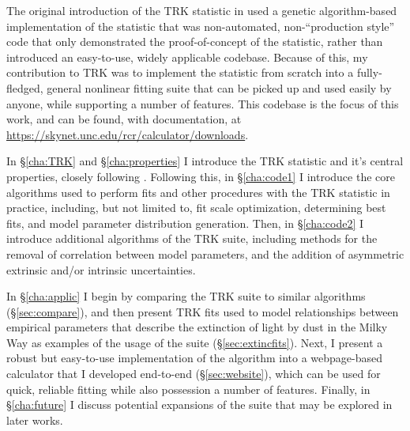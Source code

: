The original introduction of the TRK statistic in \textcite{trotter} used a genetic algorithm-based implementation of the statistic that was non-automated, non-``production style'' code that only demonstrated the proof-of-concept of the statistic, rather than introduced an easy-to-use, widely applicable codebase. Because of this, my contribution to TRK was to implement the statistic from scratch into a fully-fledged, general nonlinear fitting suite that can be picked up and used easily by anyone, while supporting a number of features. This codebase is the focus of this work, and can be found, with documentation, at \url{https://skynet.unc.edu/rcr/calculator/downloads}.

In \S\ref{cha:TRK} and \S\ref{cha:properties} I introduce the TRK statistic and it's central properties, closely following \textcite{trotter}. Following this, in \S\ref{cha:code1} I introduce the core algorithms used to perform fits and other procedures with the TRK statistic in practice, including, but not limited to, fit scale optimization, determining best fits, and model parameter distribution generation. Then, in \S\ref{cha:code2} I introduce additional algorithms of the TRK suite, including methods for the removal of correlation between model parameters, and the addition of asymmetric extrinsic and/or intrinsic uncertainties.

In \S\ref{cha:applic} I begin by comparing the TRK suite to similar algorithms (\S\ref{sec:compare}), and then present TRK fits used to model relationships between empirical parameters that describe the extinction of light by dust in the Milky Way as examples of the usage of the suite (\S\ref{sec:extincfits}). Next, I present a robust but easy-to-use implementation of the algorithm into a webpage-based calculator that I developed end-to-end (\S\ref{sec:website}), which can be used for quick, reliable fitting while also possession a number of features. Finally, in \S\ref{cha:future} I discuss potential expansions of the suite that may be explored in later works.

